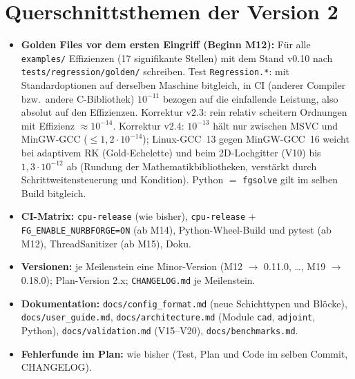 \section{Querschnittsthemen der Version 2}\label{sec:extcross}
\begin{itemize}[nosep]
  \item \textbf{Golden Files vor dem ersten Eingriff (Beginn M12):} Für alle \verb|examples/| Effizienzen (17 signifikante
        Stellen) mit dem Stand v0.10 nach \verb|tests/regression/golden/| schreiben. Test \verb|Regression.*|: mit
        Standardoptionen auf derselben Maschine bitgleich, in CI (anderer Compiler bzw.\ andere C-Bibliothek) $10^{-11}$ bezogen auf die
        einfallende Leistung, also absolut auf den Effizienzen. Korrektur v2.3: rein relativ scheitern Ordnungen
        mit Effizienz $\approx10^{-14}$. Korrektur v2.4: $10^{-13}$ hält nur zwischen MSVC und MinGW-GCC
        ($\le1{,}2\cdot10^{-14}$); Linux-GCC~13 gegen MinGW-GCC~16 weicht bei adaptivem RK (Gold-Echelette) und
        beim 2D-Lochgitter (V10) bis $1{,}3\cdot10^{-12}$ ab (Rundung der Mathematikbibliotheken, verstärkt durch
        Schrittweitensteuerung und Kondition). Python $=$ \verb|fgsolve| gilt im selben Build bitgleich.
  \item \textbf{CI-Matrix:} \verb|cpu-release| (wie bisher), \verb|cpu-release| + \verb|FG_ENABLE_NURBFORGE=ON| (ab M14),
        Python-Wheel-Build und pytest (ab M12), ThreadSanitizer (ab M15), Doku.
  \item \textbf{Versionen:} je Meilenstein eine Minor-Version (M12 $\to$ 0.11.0, \dots, M19 $\to$ 0.18.0); Plan-Version 2.x;
        \verb|CHANGELOG.md| je Meilenstein.
  \item \textbf{Dokumentation:} \verb|docs/config_format.md| (neue Schichttypen und Blöcke), \verb|docs/user_guide.md|,
        \verb|docs/architecture.md| (Module \verb|cad|, \verb|adjoint|, Python), \verb|docs/validation.md| (V15--V20),
        \verb|docs/benchmarks.md|.
  \item \textbf{Fehlerfunde im Plan:} wie bisher (Test, Plan und Code im selben Commit, CHANGELOG).
\end{itemize}


